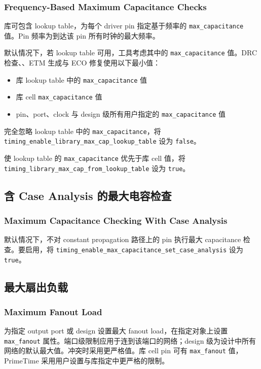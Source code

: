 \subsubsection*{Frequency-Based Maximum Capacitance Checks}

库可包含 lookup table，为每个 driver pin 指定基于频率的 \texttt{max\_capacitance} 值。Pin 频率为到达该 pin 所有时钟的最大频率。

默认情况下，若 lookup table 可用，工具考虑其中的 \texttt{max\_capacitance} 值。DRC 检查、、ETM 生成与 ECO 修复使用以下最小值：
\begin{itemize}
  \item 库 lookup table 中的 \texttt{max\_capacitance} 值
  \item 库 cell \texttt{max\_capacitance} 值
  \item pin、port、clock 与 design 级所有用户指定的 \texttt{max\_capacitance} 值
\end{itemize}

完全忽略 lookup table 中的 \texttt{max\_capacitance}，将 \texttt{timing\_enable\_library\_max\_cap\_lookup\_table} 设为 \texttt{false}。

使 lookup table 的 \texttt{max\_capacitance} 优先于库 cell 值，将 \texttt{timing\_library\_max\_cap\_from\_lookup\_table} 设为 \texttt{true}。

\subsection{含 Case Analysis 的最大电容检查}
\subsubsection*{Maximum Capacitance Checking With Case Analysis}

默认情况下，不对 constant propagation 路径上的 pin 执行最大 capacitance 检查。要启用，将 \texttt{timing\_enable\_max\_capacitance\_set\_case\_analysis} 设为 \texttt{true}。

\subsection{最大扇出负载}
\subsubsection*{Maximum Fanout Load}

 为指定 output port 或 design 设置最大 fanout load，在指定对象上设置 \texttt{max\_fanout} 属性。端口级限制应用于连到该端口的网络；design 级为设计中所有网络的默认最大值。冲突时采用更严格值。库 cell pin 可有 \texttt{max\_fanout} 值，PrimeTime 采用用户设置与库指定中更严格的限制。

